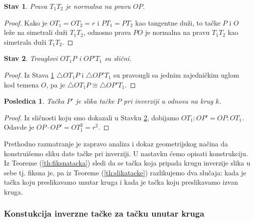 \documentclass[a4paper,12pt]{article}
\newtheorem{stav}{{Stav}}[section]
\newtheorem{posledica}{Posledica}
\theoremstyle{definition}
\begin{document}
\begin{stav}
\label{st:normala}
Prava $T_1T_2$ je normalna na pravu $OP$.
\end{stav}

\begin{proof}
Kako je $OT_1=OT_2=r$ i $PT_1=PT_2$ kao tangentne du\v{z}i, to ta\v{c}ke $P$ i $O$ le\v{z}e na simetrali du\v{z}i $T_1T_2$, odnosno prava $PO$ je normalna na pravu $T_1T_2$ kao simetrala du\v{z}i $T_1T_2$. 
\end{proof}

\begin{stav}
\label{st:slicnost}
Trouglovi $OT_1P$ i $OP'T_1$ su sli\v{c}ni.
\end{stav}

\begin{proof}
Iz Stava \ref{st:normala} $\bigtriangleup OT_1P$ i $\bigtriangleup OP'T_1$ su pravougli sa jednim zajedni\v{c}kim uglom kod temena $O$, pa je $\bigtriangleup OT_1P \cong\bigtriangleup OP'T_1$.
\end{proof}

\begin{posledica}
Ta\v{c}ka $P'$ je slika ta\v{c}ke $P$ pri inverziji u odnosu na krug $k$.
\end{posledica}

\begin{proof}
Iz sli\v{c}nosti koju smo dokazali u Stavku \ref{st:slicnost}, dobijamo $OT_1:OP'=OP:OT_1$. Odavde je $OP \cdot OP'=OT_1^2=r^2$.
\end{proof}

Prethodno razmatranje je zapravo analiza i dokaz geometrijskog na\v{c}ina da konstrui\v{s}emo sliku date ta\v{c}ke pri inverziji.
U nastavku \'{c}emo opisati konstrukciju.\\

Iz Teoreme (\ref{th:fiksnatacka}) sledi da se ta\v{c}ka koja pripada krugu inverzije slika u sebe tj. fiksna je, pa iz Teoreme (\ref{th:slikatacke}) razlikujemo dva slu\v{c}aja: kada je ta\v{c}ka koju preslikavamo unutar kruga i kada je ta\v{c}ka koju preslikavamo izvan kruga.

\subsubsection*{Konstukcija inverzne ta\v{c}ke za ta\v{c}ku unutar kruga}
\end{document}
